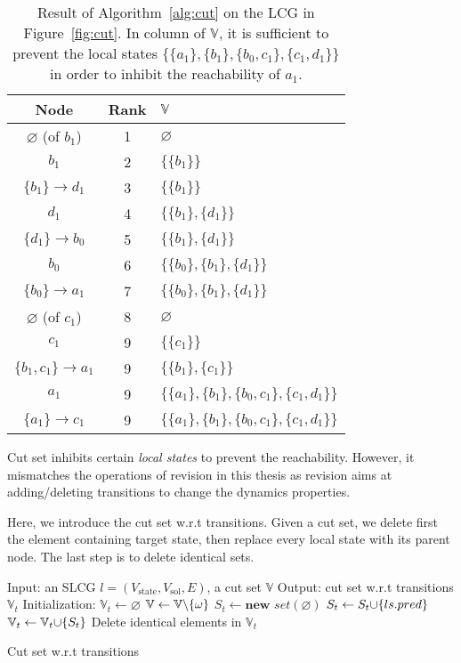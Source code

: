 \begin{table}[ht]
\centering
\begin{tabular}{|c|c|l|}
 \hline 
 Node & Rank & $\mathbb{V}$ \\ 
 \hline 
 $\varnothing$ (of $b_1$) & 1 & $\varnothing$ \\ 
 \hline 
 $b_1$ & 2 & $\{\{b_1\}\}$ \\ 
 \hline 
 $\{b_1\}\to d_1$ & 3 & $\{\{b_1\}\}$ \\ 
 \hline 
 $d_1$ & 4 & $\{\{b_1\},\{d_1\}\}$ \\ 
 \hline 
 $\{d_1\}\to b_0$ & 5 & $\{\{b_1\},\{d_1\}\}$ \\ 
 \hline 
 $b_0$ & 6 & $\{\{b_0\},\{b_1\},\{d_1\}\}$ \\ 
 \hline 
 $\{b_0\}\to a_1$ & 7 & $\{\{b_0\},\{b_1\},\{d_1\}\}$ \\ 
 \hline 
 $\varnothing$ (of $c_1$) & 8 & $\varnothing$ \\ 
 \hline 
 $c_1$ & 9 & $\{\{c_1\}\}$ \\ 
 \hline 
 $\{b_1,c_1\}\to a_1$ & 9 & $\{\{b_1\},\{c_1\}\}$ \\ 
 \hline 
 $a_1$ & 9 & $\{\{a_1\},\{b_1\},\{b_0,c_1\},\{c_1,d_1\}\}$ \\ 
 \hline 
 $\{a_1\}\to c_1$ & 9 & $\{\{a_1\},\{b_1\},\{b_0,c_1\},\{c_1,d_1\}\}$ \\ 
 \hline 
 \end{tabular}
 \caption[Example of cut set]{Result of Algorithm~\ref{alg:cut} on the LCG in Figure~\ref{fig:cut}.
 In column of $\mathbb{V}$, it is sufficient to prevent the local states $\{\{a_1\},\{b_1\},\{b_0,c_1\},\{c_1,d_1\}\}$ in order to inhibit the reachability of $a_1$.}\label{tab:cutset}
\end{table}

Cut set inhibits certain \textit{local states} to prevent the reachability.
However, it mismatches the operations of revision in this thesis as revision aims at adding/deleting transitions to change the dynamics properties.

Here, we introduce the cut set w.r.t transitions.
Given a cut set, we delete first the element containing target state, then replace every local state with its parent node.
The last step is to delete identical sets.

\begin{algorithm}[ht]
\begin{algorithmic}
\State Input: an SLCG $l= (V_{\mathrm{state}},V_{\mathrm{sol}},E)$, a cut set $\mathbb{V}$
\State Output: cut set w.r.t transitions $\mathbb{V}_t$
\State Initialization: $\mathbb{V}_t\gets \varnothing$
        \State $\mathbb{V}\gets \mathbb{V}\miset{\omega}$
    \EndIf
    \State $S_t\gets \textbf{new } set(\varnothing)$
        \State $S_t\gets S_t\addset{ls.pred}$
    \EndFor
    \State $\mathbb{V}_t\gets \mathbb{V}_t\addset{S_t}$
\EndFor
\State Delete identical elements in $\mathbb{V}_t$
\State {}
\end{algorithmic}
\caption{Cut set w.r.t transitions}\label{alg:cutsetTr}
\end{algorithm}

